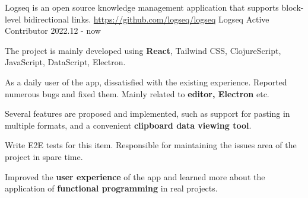 \begin{cventries}
\cventry
     {Logseq is an open source knowledge management application that supports block-level bidirectional links. \href{https://github.com/logseq/logseq}{https://github.com/logseq/logseq}} %
     {Logseq Active Contributor} %
     {} %
     {2022.12 - now} %
     {
       \begin{cvitems} %
         \item {The project is mainly developed using \textbf{React}, Tailwind CSS, ClojureScript, JavaScript, DataScript, Electron. }
         \item{As a daily user of the app, dissatisfied with the existing experience. Reported numerous bugs and fixed them. Mainly related to \textbf{editor, Electron} etc. }
         \item {Several features are proposed and implemented, such as support for pasting in multiple formats, and a convenient \textbf{clipboard data viewing tool}. }
         \item{Write E2E tests for this item. Responsible for maintaining the issues area of the project in spare time. }
         \item{Improved the \textbf{user experience} of the app and learned more about the application of \textbf{functional programming} in real projects. }
       \end{cvitems}
     }

\end{cventries}